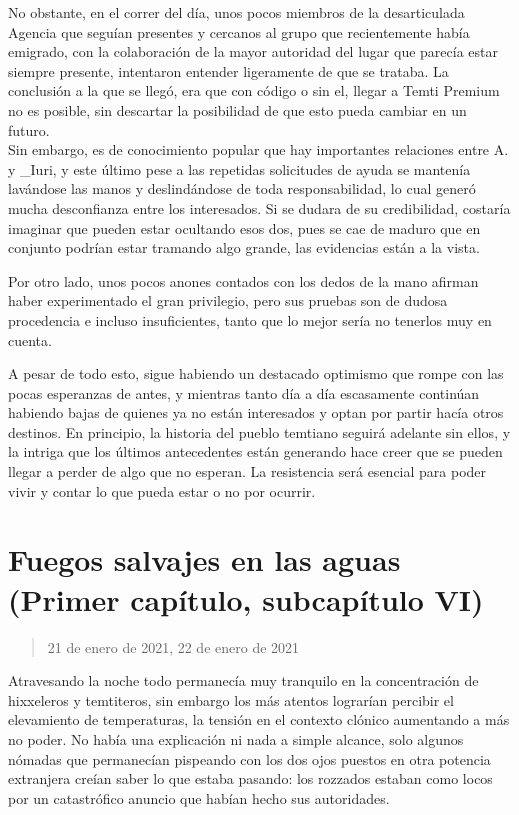 \documentclass[
  spanish,
]{book}
\begin{document}
No obstante, en el correr del día, unos pocos miembros de la desarticulada Agencia que seguían presentes y cercanos al grupo que recientemente había emigrado, con la colaboración de la mayor autoridad del lugar que parecía estar siempre presente, intentaron entender ligeramente de que se trataba. La conclusión a la que se llegó, era que con código o sin el, llegar a Temti Premium no es posible, sin descartar la posibilidad de que esto pueda cambiar en un futuro.\\

Sin embargo, es de conocimiento popular que hay importantes relaciones entre A. y \_Iuri, y este último pese a las repetidas solicitudes de ayuda se mantenía lavándose las manos y deslindándose de toda responsabilidad, lo cual generó mucha desconfianza entre los interesados. Si se dudara de su credibilidad, costaría imaginar que pueden estar ocultando esos dos, pues se cae de maduro que en conjunto podrían estar tramando algo grande, las evidencias están a la vista.

Por otro lado, unos pocos anones contados con los dedos de la mano afirman haber experimentado el gran privilegio, pero sus pruebas son de dudosa procedencia e incluso insuficientes, tanto que lo mejor sería no tenerlos muy en cuenta.

A pesar de todo esto, sigue habiendo un destacado optimismo que rompe con las pocas esperanzas de antes, y mientras tanto día a día escasamente continúan habiendo bajas de quienes ya no están interesados y optan por partir hacía otros destinos. En principio, la historia del pueblo temtiano seguirá adelante sin ellos, y la intriga que los últimos antecedentes están generando hace creer que se pueden llegar a perder de algo que no esperan. La resistencia será esencial para poder vivir y contar lo que pueda estar o no por ocurrir.

\hypertarget{fuegos-salvajes-en-las-aguas-primer-capuxedtulo-subcapuxedtulo-vi}{%
\section{Fuegos salvajes en las aguas (Primer capítulo, subcapítulo VI)}\label{fuegos-salvajes-en-las-aguas-primer-capuxedtulo-subcapuxedtulo-vi}}

\begin{quote}
21 de enero de 2021, 22 de enero de 2021
\end{quote}

Atravesando la noche todo permanecía muy tranquilo en la concentración de hixxeleros y temtiteros, sin embargo los más atentos lograrían percibir el elevamiento de temperaturas, la tensión en el contexto clónico aumentando a más no poder. No había una explicación ni nada a simple alcance, solo algunos nómadas que permanecían pispeando con los dos ojos puestos en otra potencia extranjera creían saber lo que estaba pasando: los rozzados estaban como locos por un catastrófico anuncio que habían hecho sus autoridades.
\end{document}
